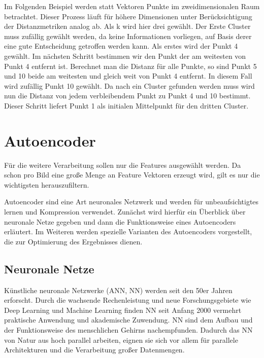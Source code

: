 Im Folgenden Beispiel werden statt Vektoren Punkte im zweidimensionalen Raum betrachtet. Dieser Prozess läuft für höhere Dimensionen unter Berücksichtigung der Distanzmetriken analog ab. Als k wird hier drei gewählt. Der Erste Cluster muss zufällig gewählt werden, da keine Informationen vorliegen, auf Basis derer eine gute Entscheidung getroffen werden kann. Als erstes wird der Punkt 4 gewählt. Im nächsten Schritt bestimmen wir den Punkt der am weitesten von Punkt 4 entfernt ist. Berechnet man die Distanz für alle Punkte, so sind Punkt 5 und 10 beide am weitesten und gleich weit von Punkt 4 entfernt. In diesem Fall wird zufällig Punkt 10 gewählt. Da nach ein Cluster gefunden werden muss wird nun die Distanz von jedem verbleibendem Punkt zu Punkt 4 und 10 bestimmt. Dieser Schritt liefert Punkt 1 als initialen Mittelpunkt für den dritten Cluster. \cite{mmd2011}

\section{Autoencoder}

Für die weitere Verarbeitung sollen nur die Features ausgewählt werden. Da schon pro Bild eine große Menge an Feature Vektoren erzeugt wird, gilt es nur die wichtigsten herauszufiltern. 


Autoencoder sind eine Art neuronales Netzwerk und werden für unbeaufsichtigtes lernen und Kompression verwendet. Zunächst wird hierfür ein Überblick über neuronale Netze gegeben und dann die Funktionsweise eines Autoencoders erläutert. Im Weiteren werden spezielle Varianten des Autoencoders vorgestellt, die zur Optimierung des Ergebnisses dienen.

\subsection{Neuronale Netze}

Künstliche neuronale Netzwerke (ANN, NN) werden seit den 50er Jahren erforscht. Durch die wachsende Rechenleistung und neue Forschungsgebiete wie Deep Learning und Machine Learning finden NN seit Anfang 2000 vermehrt praktische Anwendung und akademische Zuwendung. NN sind dem Aufbau und der Funktionsweise des menschlichen Gehirns nachempfunden. Dadurch das NN von Natur aus hoch parallel arbeiten, eignen sie sich vor allem für parallele Architekturen und die Verarbeitung großer Datenmengen. 

